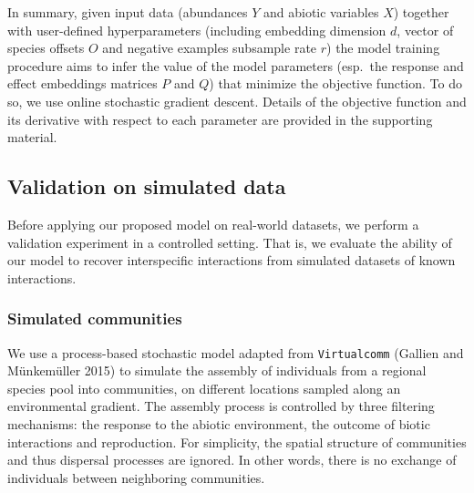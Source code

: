 \documentclass[]{article}
\newcommand{\EffMat}{Q}
\newcommand{\ResMat}{P}
\newcommand{\abioM}{X}
\newcommand{\abdM}{Y}
\begin{document}
In summary, given input data (abundances $\abdM$ and abiotic variables $\abioM$) together with user-defined hyperparameters (including embedding dimension $d$, vector of species offsets $O$ and negative examples subsample rate $r$) the model training procedure aims to infer the value of the model parameters (esp.\ the response and effect embeddings matrices $\ResMat$ and $\EffMat$) that minimize the objective function. To do so, we use online stochastic gradient descent. Details of the objective function and its derivative with respect to each parameter are provided in the supporting material.


\subsection{Validation on simulated data}

Before applying our proposed model on real-world datasets, we perform a validation experiment in a controlled setting. That is, we evaluate the ability of our model to recover interspecific interactions from simulated datasets of known interactions.

\subsubsection{Simulated communities}
We use a process-based stochastic model adapted from \texttt{Virtualcomm} (Gallien and Münkemüller 2015) to simulate the assembly of individuals from a regional species pool into communities, on different locations sampled along an environmental gradient. The assembly process is controlled by three filtering mechanisms: the response to the abiotic environment, the outcome of biotic interactions and reproduction.  For simplicity, the spatial structure of communities and thus dispersal processes are ignored. In other words, there is no exchange of individuals between neighboring communities.
\end{document}
